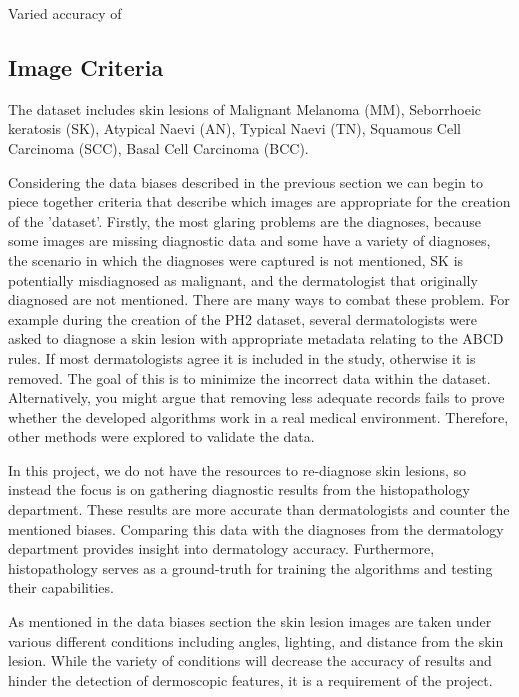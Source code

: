 Varied accuracy of 

\subsection{Image Criteria}

The dataset includes skin lesions of Malignant Melanoma (MM), Seborrhoeic keratosis (SK), Atypical Naevi (AN), Typical Naevi (TN), Squamous Cell Carcinoma (SCC), Basal Cell Carcinoma (BCC). 

Considering the data biases described in the previous section we can begin to piece together criteria that describe which images are appropriate for the creation of the 'dataset'. Firstly, the most glaring problems are the diagnoses, because some images are missing diagnostic data and some have a variety of diagnoses, the scenario in which the diagnoses were captured is not mentioned, 
SK is potentially misdiagnosed as malignant, and the dermatologist that originally diagnosed are not mentioned. There are many ways to combat these problem. For example during the creation of the PH2 dataset\cite{mendonca2013}, several dermatologists were asked to diagnose a skin lesion with appropriate metadata relating to the ABCD rules. If most dermatologists agree it is included in the study, otherwise it is removed. The goal of this is to minimize the incorrect data within the dataset. Alternatively, you might argue that removing less adequate records fails to prove whether the developed algorithms work in a real medical environment. Therefore, other methods were explored to validate the data.

In this project, we do not have the resources to re-diagnose skin lesions, so instead the focus is on gathering diagnostic results from the histopathology department. These results are more accurate than dermatologists\cite{Morton1998} and counter the mentioned biases. Comparing this data with the diagnoses from the dermatology department provides insight into dermatology accuracy. Furthermore, histopathology serves as a ground-truth for training the algorithms and testing their capabilities.

As mentioned in the data biases section the skin lesion images are taken under various different conditions including angles, lighting, and distance from the skin lesion. While the variety of conditions will decrease the accuracy of results and hinder the detection of dermoscopic features, it is a requirement of the project. 

